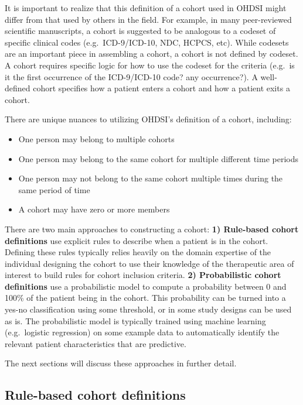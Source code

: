 \documentclass[11pt]{book}
\providecommand{\tightlist}{%
  \setlength{\itemsep}{0pt}\setlength{\parskip}{0pt}}
\theoremstyle{definition}
\theoremstyle{definition}
\theoremstyle{definition}
\theoremstyle{remark}
\begin{document}
 
It is important to realize that this definition of a cohort used in OHDSI might differ from that used by others in the field. For example, in many peer-reviewed scientific manuscripts, a cohort is suggested to be analogous to a codeset of specific clinical codes (e.g.~ICD-9/ICD-10, NDC, HCPCS, etc). While codesets are an important piece in assembling a cohort, a cohort is not defined by codeset. A cohort requires specific logic for how to use the codeset for the criteria (e.g.~is it the first occurrence of the ICD-9/ICD-10 code? any occurrence?). A well-defined cohort specifies how a patient enters a cohort and how a patient exits a cohort.

There are unique nuances to utilizing OHDSI's definition of a cohort, including:

\begin{itemize}
\tightlist
\item
  One person may belong to multiple cohorts
\item
  One person may belong to the same cohort for multiple different time periods
\item
  One person may not belong to the same cohort multiple times during the same period of time
\item
  A cohort may have zero or more members
\end{itemize}

There are two main approaches to constructing a cohort:
\textbf{1) Rule-based cohort definitions} use explicit rules to describe when a patient is in the cohort. Defining these rules typically relies heavily on the domain expertise of the individual designing the cohort to use their knowledge of the therapeutic area of interest to build rules for cohort inclusion criteria.
\textbf{2) Probabilistic cohort definitions} use a probabilistic model to compute a probability between 0 and 100\% of the patient being in the cohort. This probability can be turned into a yes-no classification using some threshold, or in some study designs can be used as is. The probabilistic model is typically trained using machine learning (e.g.~logistic regression) on some example data to automatically identify the relevant patient characteristics that are predictive.

The next sections will discuss these approaches in further detail.

\hypertarget{rule-based-cohort-definitions}{%
\subsection{Rule-based cohort definitions}\label{rule-based-cohort-definitions}}
\end{document}
